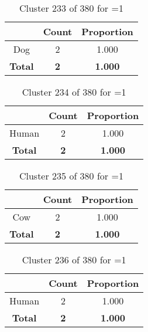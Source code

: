 \begin{table}[ht!]
\centering
\begin{tabular}{|c|c|c|}
\hline
\bf \Spec{} &\bf Count &\bf Proportion\\ \hline \hline
Dog & 2 & 1.000\\ \hline
\hline
\bf Total & \bf 2 & \bf 1.000\\ \hline
\end{tabular}
\label{tab:cluster:233:1}
\caption{Cluster 233 of 380 for \minneigh{}=1}
\end{table}

\begin{table}[ht!]
\centering
\begin{tabular}{|c|c|c|}
\hline
\bf \Spec{} &\bf Count &\bf Proportion\\ \hline \hline
Human & 2 & 1.000\\ \hline
\hline
\bf Total & \bf 2 & \bf 1.000\\ \hline
\end{tabular}
\label{tab:cluster:234:1}
\caption{Cluster 234 of 380 for \minneigh{}=1}
\end{table}

\begin{table}[ht!]
\centering
\begin{tabular}{|c|c|c|}
\hline
\bf \Spec{} &\bf Count &\bf Proportion\\ \hline \hline
Cow & 2 & 1.000\\ \hline
\hline
\bf Total & \bf 2 & \bf 1.000\\ \hline
\end{tabular}
\label{tab:cluster:235:1}
\caption{Cluster 235 of 380 for \minneigh{}=1}
\end{table}

\begin{table}[ht!]
\centering
\begin{tabular}{|c|c|c|}
\hline
\bf \Spec{} &\bf Count &\bf Proportion\\ \hline \hline
Human & 2 & 1.000\\ \hline
\hline
\bf Total & \bf 2 & \bf 1.000\\ \hline
\end{tabular}
\label{tab:cluster:236:1}
\caption{Cluster 236 of 380 for \minneigh{}=1}
\end{table}


